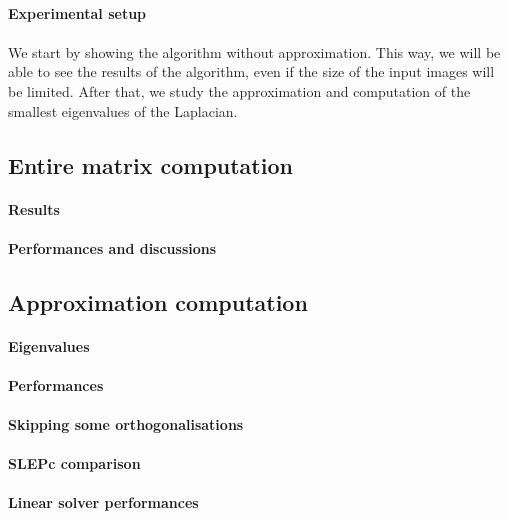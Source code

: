 \paragraph{Experimental setup}


\paragraph{}
We start by showing the algorithm without approximation.
This way, we will be able to see the results of the algorithm, even if the size of the input images will be limited.
After that, we study the approximation and computation of the smallest eigenvalues of the Laplacian.

\subsection{Entire matrix computation}

\paragraph{Results}


\paragraph{Performances and discussions}


\subsection{Approximation computation}

\paragraph{Eigenvalues}


\paragraph{Performances}


\paragraph{Skipping some orthogonalisations}


\paragraph{SLEPc comparison}


\paragraph{Linear solver performances}

